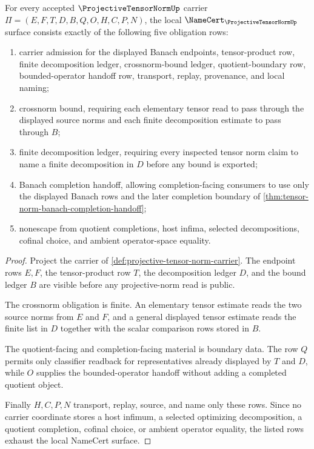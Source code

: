 \begin{theorem}
\label{thm:projective-tensor-norm-namecert-obligations}
For every accepted $\ProjectiveTensorNormUp$ carrier $\Pi=(E,F,T,D,B,Q,O,H,C,P,N)$, the local $\NameCert_{\ProjectiveTensorNormUp}$ surface consists exactly of the following five obligation rows:
\begin{enumerate}
\item carrier admission for the displayed Banach endpoints, tensor-product row, finite decomposition ledger, crossnorm-bound ledger, quotient-boundary row, bounded-operator handoff row, transport, replay, provenance, and local naming;
\item crossnorm bound, requiring each elementary tensor read to pass through the displayed source norms and each finite decomposition estimate to pass through $B$;
\item finite decomposition ledger, requiring every inspected tensor norm claim to name a finite decomposition in $D$ before any bound is exported;
\item Banach completion handoff, allowing completion-facing consumers to use only the displayed Banach rows and the later completion boundary of \autoref{thm:tensor-norm-banach-completion-handoff};
\item nonescape from quotient completions, host infima, selected decompositions, cofinal choice, and ambient operator-space equality.
\end{enumerate}
\end{theorem}
\begin{proof}
Project the carrier of \autoref{def:projective-tensor-norm-carrier}. The endpoint rows $E,F$, the tensor-product row $T$, the decomposition ledger $D$, and the bound ledger $B$ are visible before any projective-norm read is public.

The crossnorm obligation is finite. An elementary tensor estimate reads the two source norms from $E$ and $F$, and a general displayed tensor estimate reads the finite list in $D$ together with the scalar comparison rows stored in $B$.

The quotient-facing and completion-facing material is boundary data. The row $Q$ permits only classifier readback for representatives already displayed by $T$ and $D$, while $O$ supplies the bounded-operator handoff without adding a completed quotient object.

Finally $H,C,P,N$ transport, replay, source, and name only these rows. Since no carrier coordinate stores a host infimum, a selected optimizing decomposition, a quotient completion, cofinal choice, or ambient operator equality, the listed rows exhaust the local NameCert surface.
\end{proof}

